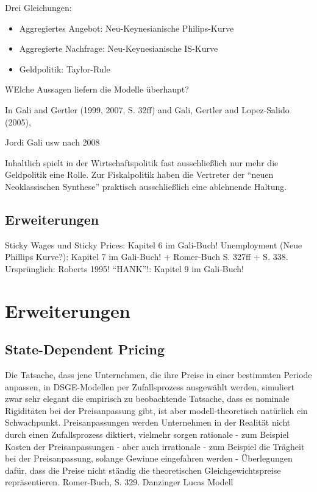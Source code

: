 Drei Gleichungen:
\begin{itemize}
	\item Aggregiertes Angebot: Neu-Keynesianische Philips-Kurve
	\item Aggregierte Nachfrage: Neu-Keynesianische IS-Kurve
	\item Geldpolitik: Taylor-Rule
\end{itemize}



WElche Aussagen liefern die Modelle überhaupt? 






In Gali and Gertler (1999, 2007, S. 32ff) and Gali, Gertler and Lopez-Salido (2005),



Jordi Gali usw nach 2008




Inhaltlich spielt in der Wirtschaftspolitik fast ausschließlich nur mehr die Geldpolitik eine Rolle. Zur Fiskalpolitik haben die Vertreter der "`neuen Neoklassischen Synthese"' praktisch ausschließlich eine ablehnende Haltung.





\subsection{Erweiterungen}
\label{ErweiterungDSGE}
Sticky Wages und Sticky Prices: Kapitel 6 im Gali-Buch!
Unemployment (Neue Phillips Kurve?): Kapitel 7 im Gali-Buch! + Romer-Buch S. 327ff + S. 338. Ursprünglich: Roberts 1995!
"`HANK"'!: Kapitel 9 im Gali-Buch!









\section{Erweiterungen}
\subsection{State-Dependent Pricing}
Die Tatsache, dass jene Unternehmen, die ihre Preise in einer bestimmten Periode anpassen, in DSGE-Modellen per Zufallsprozess ausgewählt werden, simuliert zwar sehr elegant die empirisch zu beobachtende Tatsache, dass es nominale Rigiditäten bei der Preisanpassung gibt, ist aber modell-theoretisch natürlich ein Schwachpunkt. Preisanpassungen werden Unternehmen in der Realität nicht durch einen Zufallsprozess diktiert, vielmehr sorgen rationale - zum Beispiel Kosten der Preisanpassungen - aber auch irrationale - zum Beispiel die Trägheit bei der Preisanpassung, solange Gewinne eingefahren werden - Überlegungen dafür, dass die Preise nicht ständig die theoretischen Gleichgewichtspreise repräsentieren.
Romer-Buch, S. 329.
Danzinger Lucas Modell

